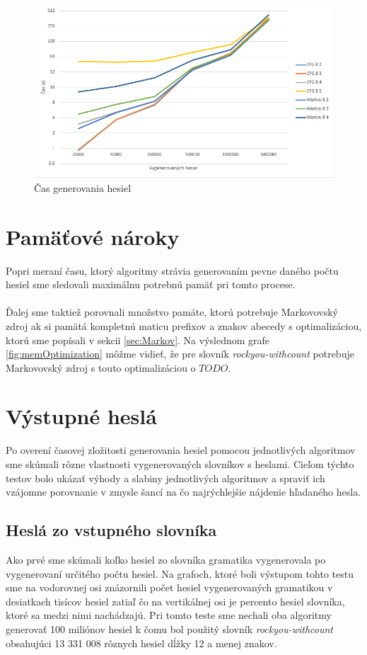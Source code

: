 \begin{figure}[ht]
    \centering
    \includegraphics[width=1\textwidth]{generateTime}
    \caption{Čas generovania hesiel}
    \label{fig:generateTime}
\end{figure}

\section{Pamäťové nároky}
Popri meraní času, ktorý algoritmy strávia generovaním pevne daného počtu hesiel sme sledovali maximálnu potrebnú pamäť pri tomto procese.

\paragraph{}
Ďalej sme taktiež porovnali množstvo pamäte, ktorú potrebuje Markovovský zdroj ak si pamätá kompletnú maticu prefixov a znakov abecedy s optimalizáciou, ktorú sme popísali v sekcii \ref{sec:Markov}. Na výslednom grafe \ref{fig:memOptimization} môžme vidieť, že pre slovník \emph{rockyou-withcount} potrebuje Markovovský zdroj s touto optimalizáciou o \(TODO\).

\section{Výstupné heslá}
\label{sec:pass}
Po overení časovej zložitosti generovania hesiel pomocou jednotlivých algoritmov sme skúmali rôzne vlastnosti vygenerovaných slovníkov s heslami. Cieľom týchto testov bolo ukázať výhody a slabiny jednotlivých algoritmov a spraviť ich vzájomne porovnanie v zmysle šancí na čo najrýchlejšie nájdenie hľadaného hesla.

\subsection{Heslá zo vstupného slovníka}
Ako prvé sme skúmali koľko hesiel zo slovníka gramatika vygenerovala po vygenerovaní určitého počtu hesiel. Na grafoch, ktoré boli výstupom tohto testu sme na vodorovnej osi znázornili počet hesiel vygenerovaných gramatikou v desiatkach tisícov hesiel zatiaľ čo na vertikálnej osi je percento hesiel slovníka, ktoré sa medzi nimi nachádzajú. Pri tomto teste sme nechali oba algoritmy generovať 100 miliónov hesiel k čomu bol použitý slovník \emph{rockyou-withcount} obsahujúci 13 331 008 rôznych hesiel dĺžky 12 a menej znakov.

